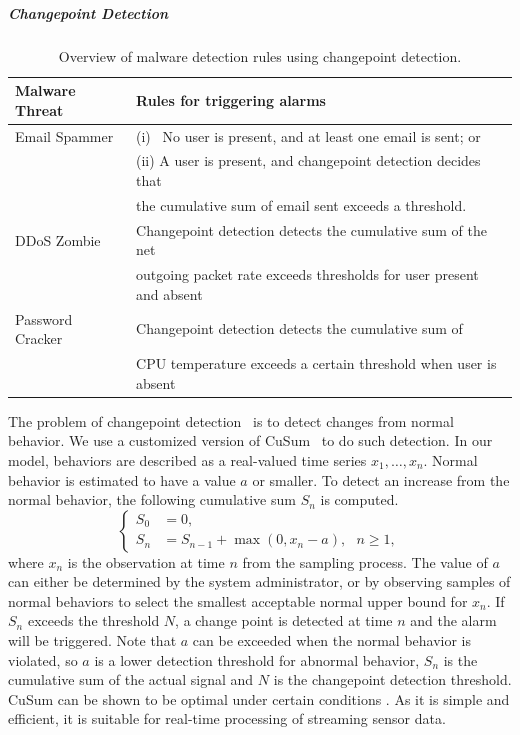 \subparagraph{Changepoint Detection}\label{subsec:changepoint}

\begin{table}[tb]
  \centering
  \begin{tabular}{|l|l|}
  \hline
  Malware Threat & Rules for triggering alarms \\
  \hline
  Email Spammer & (i) \ No user is present, and at least one email is sent; or \\
                & (ii) A user is present, and changepoint detection decides that \\
                & \hspace*{2em} the cumulative sum of email sent exceeds a threshold. \\
  \hline
  DDoS Zombie   & Changepoint detection detects the cumulative sum of the net \\
                & outgoing packet rate
        exceeds thresholds for user present and absent \\
  \hline
  Password Cracker & Changepoint detection detects the cumulative sum of \\
                   & CPU temperature exceeds a certain threshold
                   when user is absent  \\
  \hline
  \end{tabular}
  \caption{Overview of malware detection rules using changepoint detection. }\label{tbl:detect-malware}
\end{table}

The problem of changepoint detection~\cite{ChangpointBook93} is to
detect changes from normal behavior.
We use a customized version of CuSum~\cite{Page54} to do such
detection. In our model, behaviors are described as a real-valued
time series $x_1, \ldots, x_n$. Normal behavior is estimated to have a value
$a$ or smaller. To detect an
increase from the normal behavior,
the following cumulative sum $S_n$ is computed.
\begin{displaymath}
\left\{
\begin{aligned}
S_0 &= 0, \\
S_n &= S_{n-1} + \max(0, x_{n} - a), \ \ \ n \geq 1,
\end{aligned}
\right.
\end{displaymath}
\noindent where $x_n$ is the observation at time $n$ from the
sampling process. The value of $a$ can either be determined by the system
administrator, or by observing samples of normal behaviors to select
the smallest acceptable normal upper bound for $x_n$. If $S_n$
exceeds the threshold $N$, a change point is detected at time $n$
and the alarm will be triggered. Note that $a$ can be exceeded when
the normal behavior is violated, so $a$ is a lower detection threshold
for abnormal behavior, $S_n$ is the cumulative sum
of the actual signal and $N$ is the
changepoint detection threshold. CuSum can be shown to be optimal
under certain conditions \cite{ChangpointBook93}. As it is simple
and efficient, it is suitable for real-time processing of streaming
sensor data.

